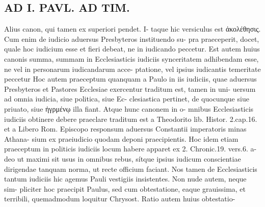 \documentclass{article}
\begin{document}
\begin{pages}
\section*{AD I. PAVL. AD TIM. }
\marginpar{[ p.628 ]}  Alius canon, qui tamen ex superiori pendet. I- taque hic versiculus est ἀκολέθησις. Cum enim de iudicio aduersus Presbyteros instituendo su- pra praeceperit, docet, quale hoc iudicium esse et fieri debeat, ne in iudicando peccetur. Est autem huius canonis summa, summam in Ecclesiasticis iudiciis synceritatem adhibendam esse, ne vel in personarum iudicandarum acce- ptatione, vel ipsius iudicantis temeritate peccetur Hoc autem praeceptum quanquam a Paulo in iis iudiciis, quae aduersus Presbyteros et Pastores Ecclesiae exercentur traditum est, tamen in uni- uersum ad omnia iudicia, siue politica, siue Ec- clesiastica pertinet, de quocunque siue priuato, siue ἠγρμένῳ illa fiant. Atque hunc canonem in o- mnibus Ecclesiasticis iudiciis obtinere debere praeclare traditum est a Theodorito lib. Histor. 2.cap.16. et a Libero Rom. Episcopo responsum aduersus Constantii imperatoris minas Athana- sium ex praeiudicio quodam deponi praecipientis. Hoc idem etiam praeceptum in politicis iudiciis locum habere apparet ex 2. Chronic.19. vers.6. a- deo ut maximi sit usus in omnibus rebus, sítque ipsius iudicum conscientiae dirigendae tanquam norma, ut recte officium faciant. Nos tamen de Ecclesiasticis tantum iudiciis hic agemus Pauli vestigiis insistentes. Non nude autem, neque sim- pliciter hoc praecipit Paulus, sed cum obtestatione, eaque grauissima, et terribili, quemadmodum loquitur Chrysost. Ratio autem huius obtestatio- 

\end{pages}
\end{document}
